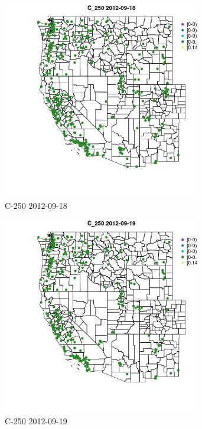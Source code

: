 \begin{figure} 
\centering  
\includegraphics[width=0.77\textwidth]{Code_Outputs/ML_input_report_ML_input_PM25_Step5_part_d_de_duplicated_aves_ML_input_MapObsC_2502012-09-18.jpg} 
\caption{\label{fig:ML_input_report_ML_input_PM25_Step5_part_d_de_duplicated_aves_ML_inputMapObsC_2502012-09-18}C-250 2012-09-18} 
\end{figure} 
 

\begin{figure} 
\centering  
\includegraphics[width=0.77\textwidth]{Code_Outputs/ML_input_report_ML_input_PM25_Step5_part_d_de_duplicated_aves_ML_input_MapObsC_2502012-09-19.jpg} 
\caption{\label{fig:ML_input_report_ML_input_PM25_Step5_part_d_de_duplicated_aves_ML_inputMapObsC_2502012-09-19}C-250 2012-09-19} 
\end{figure} 
 

